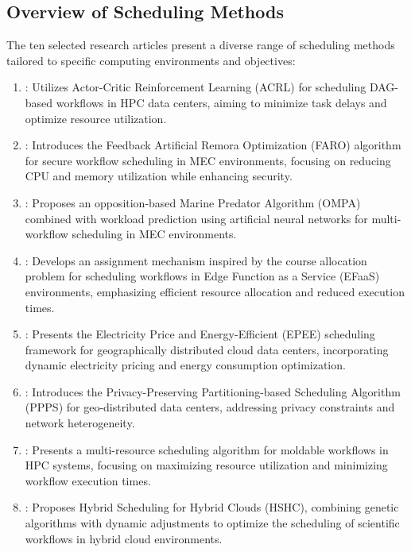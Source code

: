 \documentclass[a4paper, final]{article}
\begin{document}
\subsection{Overview of Scheduling Methods}
The ten selected research articles present a diverse range of scheduling methods tailored to specific computing 
environments and objectives:
\begin{enumerate}
\item \cite{bib:1_acrl}: Utilizes Actor-Critic Reinforcement Learning (ACRL) for scheduling DAG-based
workflows in HPC data centers, aiming to minimize task delays and optimize resource utilization.

\item \cite{bib:2_faro}: Introduces the Feedback Artificial Remora Optimization (FARO) algorithm for 
secure workflow scheduling in MEC environments, focusing on reducing CPU and memory utilization while 
enhancing security.

\item \cite{bib:6_marine}: Proposes an opposition-based Marine Predator Algorithm (OMPA) combined with 
workload prediction using artificial neural networks for multi-workflow scheduling in MEC environments.

\item \cite{bib:4_faas}: Develops an assignment mechanism inspired by the course allocation problem 
for scheduling workflows in Edge Function as a Service (EFaaS) environments, emphasizing efficient 
resource allocation and reduced execution times.

\item \cite{bib:5_epee}: Presents the Electricity Price and Energy-Efficient (EPEE) scheduling framework 
for geographically distributed cloud data centers, incorporating dynamic electricity pricing and energy 
consumption optimization.

\item \cite{bib:7_ppps}: Introduces the Privacy-Preserving Partitioning-based Scheduling Algorithm 
(PPPS) for geo-distributed data centers, addressing privacy constraints and network heterogeneity.

\item \cite{bib:8}: Presents a multi-resource scheduling algorithm for moldable workflows in HPC 
systems, focusing on maximizing resource utilization and minimizing workflow execution times.

\item \cite{bib:9}: Proposes Hybrid Scheduling for Hybrid Clouds (HSHC), combining genetic 
algorithms with dynamic adjustments to optimize the scheduling of scientific workflows in hybrid 
cloud environments.


\end{enumerate}
\end{document}
